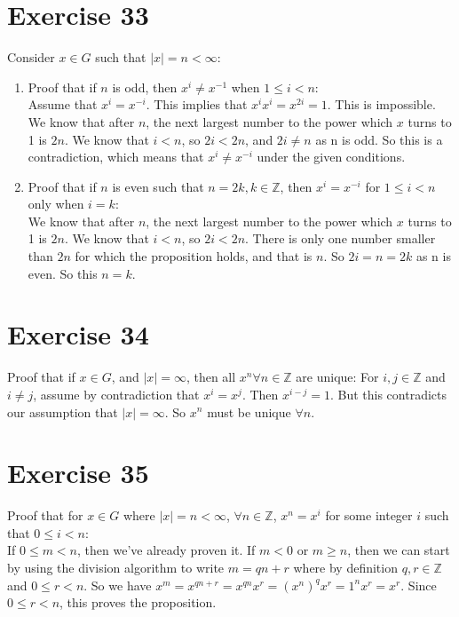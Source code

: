 \documentclass[12pt]{article}
\newcommand{\Z}{\mathbb{Z}}
\begin{document}
    \section*{Exercise 33}
    Consider $x \in G$ such that $|x| = n < \infty$:
    \begin{enumerate}[label=\textbf{\alph*.}]
        \item 
            Proof that if $n$ is odd,
            then $x^i \neq x^{-1}$ when $1 \leqslant i < n$: \\
            Assume that $x^i = x^{-i}$.
            This implies that $x^ix^i = x^{2i} = 1$.
            This is impossible. We know that after $n$, the next largest
            number to the power which $x$ turns to 1 is $2n$.
            We know that $i < n$,
            so $2i < 2n$,
            and $2i \neq n$ as n is odd.
            So this is a contradiction,
            which means that $x^i \neq x^{-i}$ under the given conditions. 
        \item 
            Proof that if $n$ is even such that $n = 2k, k \in \Z$,
            then $x^i = x^{-i}$ for $1 \leqslant i < n$ only when $i = k$: \\
            We know that after $n$, the next largest number to the power 
            which $x$ turns to 1 is $2n$.
            We know that $i < n$,
            so $2i < 2n$.
            There is only one number smaller than $2n$ for which the
            proposition holds, and that is $n$.
            So $2i = n = 2k$ as n is even.
            So this $n = k$.
    \end{enumerate}


    \section*{Exercise 34}
    Proof that if $x \in G$, and $|x| = \infty$,
    then all $x^n \forall n \in \Z$ are unique:
    For $i, j \in \Z$ and $i \neq j$, 
    assume by contradiction that $x^i = x^j$.
    Then $x^{i - j} = 1$.
    But this contradicts our assumption that $|x| = \infty$.
    So $x^n$ must be unique $\forall n$.


    \section*{Exercise 35}
    Proof that for $x \in G$ where $|x| = n < \infty$,
    $\forall n \in \Z$, $x^n = x^i$ for some integer $i$
    such that $0 \leqslant i < n$: \\
    If $0 \leqslant m < n$, then we've already proven it.
    If $m < 0$ or $m \geqslant n$,
    then we can start by using the division algorithm to write $m = qn + r$
    where by definition $q, r \in \Z$ and $0 \leqslant r < n$.
    So we have $x^m = x^{qn + r} = x^{qn}x^r = (x^n)^qx^r = 1^nx^r = x^r$.
    Since $0 \leqslant r < n$, this proves the proposition.
\end{document}
